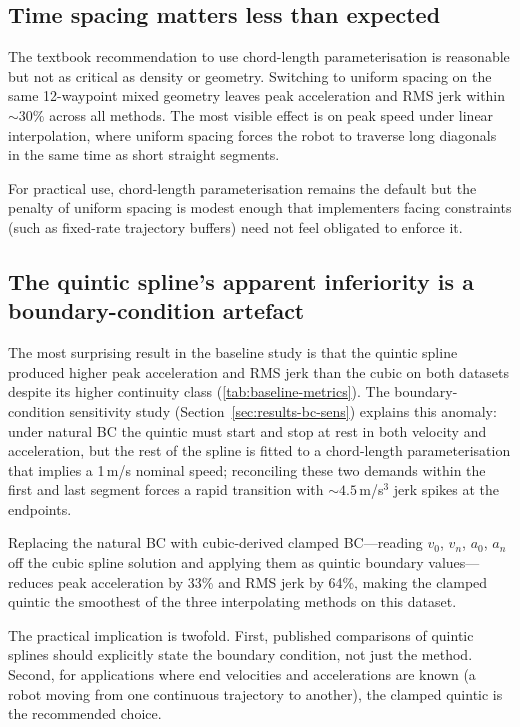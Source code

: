 \subsection{Time spacing matters less than expected}
\label{sec:disc-spacing}

The textbook recommendation to use chord-length parameterisation
\cite[Section 24.1]{chapra2021} is reasonable but not as critical as
density or geometry. Switching to uniform spacing on the same
12-waypoint mixed geometry leaves peak acceleration and RMS jerk
within $\sim 30\%$ across all methods. The most visible effect is on
peak speed under linear interpolation, where uniform spacing forces
the robot to traverse long diagonals in the same time as short
straight segments.

For practical use, chord-length parameterisation remains the
default but the penalty of uniform spacing is modest enough that
implementers facing constraints (such as fixed-rate trajectory
buffers) need not feel obligated to enforce it.

\subsection{The quintic spline's apparent inferiority is a
boundary-condition artefact}
\label{sec:disc-quintic-bc}

The most surprising result in the baseline study is that the quintic
spline produced higher peak acceleration and RMS jerk than the cubic
on both datasets despite its higher continuity class
(\cref{tab:baseline-metrics}). The boundary-condition sensitivity
study (Section~\ref{sec:results-bc-sens}) explains this anomaly:
under natural BC the quintic must start and stop at rest in both
velocity and acceleration, but the rest of the spline is fitted to a
chord-length parameterisation that implies a 1\,m/s nominal speed;
reconciling these two demands within the first and last segment
forces a rapid transition with $\sim 4.5$\,m/s$^3$ jerk spikes at the
endpoints.

Replacing the natural BC with cubic-derived clamped BC---reading
$v_0$, $v_n$, $a_0$, $a_n$ off the cubic spline solution and
applying them as quintic boundary values---reduces peak acceleration
by 33\% and RMS jerk by 64\%, making the clamped quintic the
smoothest of the three interpolating methods on this dataset.

The practical implication is twofold. First, published comparisons
of quintic splines should explicitly state the boundary condition,
not just the method. Second, for applications where end velocities
and accelerations are known (a robot moving from one continuous
trajectory to another), the clamped quintic is the recommended
choice.

